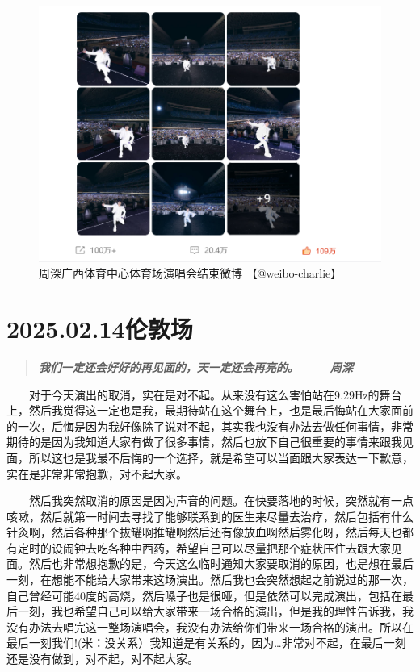 \documentclass[]{ctexbook}
\begin{document}
\begin{figure}

{\centering \includegraphics[width=400pt]{img/weibo/nanning-20241207-2} 

}

\caption{周深广西体育中心体育场演唱会结束微博 【@weibo-charlie】}\label{fig:unnamed-chunk-171}
\end{figure}

\chapter{2025.02.14伦敦场}\label{London-20250214}

\begin{quote}
\textbf{\emph{我们一定还会好好的再见面的，天一定还会再亮的。------ 周深}}
\end{quote}

  对于今天演出的取消，实在是对不起。从来没有这么害怕站在9.29Hz的舞台上，然后我觉得这一定也是我，最期待站在这个舞台上，也是最后悔站在大家面前的一次，后悔是因为我好像除了说对不起，其实我也没有办法去做任何事情，非常期待的是因为我知道大家有做了很多事情，然后也放下自己很重要的事情来跟我见面，所以这也是我最不后悔的一个选择，就是希望可以当面跟大家表达一下歉意，实在是非常非常抱歉，对不起大家。

  然后我突然取消的原因是因为声音的问题。在快要落地的时候，突然就有一点咳嗽，然后就第一时间去寻找了能够联系到的医生来尽量去治疗，然后包括有什么针灸啊，然后各种那个拔罐啊推罐啊然后还有像放血啊然后雾化呀，然后每天也都有定时的设闹钟去吃各种中西药，希望自己可以尽量把那个症状压住去跟大家见面。然后也非常想抱歉的是，今天这么临时通知大家要取消的原因，也是想在最后一刻，在想能不能给大家带来这场演出。然后我也会突然想起之前说过的那一次，自己曾经可能40度的高烧，然后嗓子也是很哑，但是依然可以完成演出，包括在最后一刻，我也希望自己可以给大家带来一场合格的演出，但是我的理性告诉我，我没有办法去唱完这一整场演唱会，我没有办法给你们带来一场合格的演出。所以在最后一刻我们!(米：没关系）我知道是有关系的，因为\ldots 非常对不起，在最后一刻还是没有做到，对不起，对不起大家。
\end{document}
